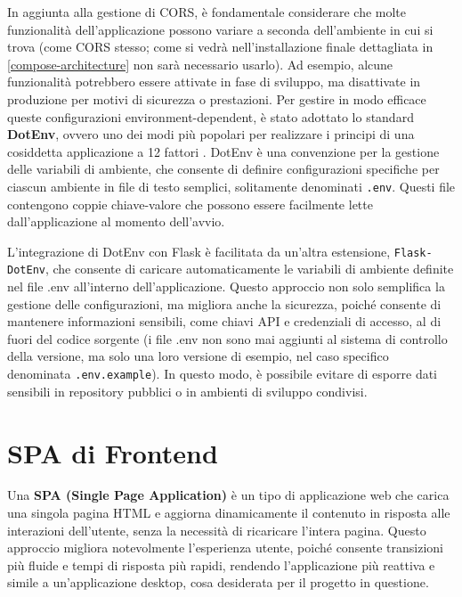 In aggiunta alla gestione di CORS, è fondamentale considerare che molte funzionalità dell'applicazione possono variare a seconda dell'ambiente in cui si trova (come CORS stesso; come si vedrà nell'installazione finale dettagliata in \ref{compose-architecture} non sarà necessario usarlo). Ad esempio, alcune funzionalità potrebbero essere attivate in fase di sviluppo, ma disattivate in produzione per motivi di sicurezza o prestazioni. Per gestire in modo efficace queste configurazioni environment-dependent, è stato adottato lo standard \textbf{DotEnv}, ovvero uno dei modi più popolari per realizzare i principi di una cosiddetta applicazione a 12 fattori \cite{12-factor}. DotEnv è una convenzione per la gestione delle variabili di ambiente, che consente di definire configurazioni specifiche per ciascun ambiente in file di testo semplici, solitamente denominati \texttt{.env}. Questi file contengono coppie chiave-valore che possono essere facilmente lette dall'applicazione al momento dell'avvio.

L'integrazione di DotEnv con Flask è facilitata da un'altra estensione, \texttt{Flask-DotEnv}, che consente di caricare automaticamente le variabili di ambiente definite nel file .env all'interno dell'applicazione. Questo approccio non solo semplifica la gestione delle configurazioni, ma migliora anche la sicurezza, poiché consente di mantenere informazioni sensibili, come chiavi API e credenziali di accesso, al di fuori del codice sorgente (i file .env non sono mai aggiunti al sistema di controllo della versione, ma solo una loro versione di esempio, nel caso specifico denominata \texttt{.env.example}). In questo modo, è possibile evitare di esporre dati sensibili in repository pubblici o in ambienti di sviluppo condivisi.

\section{SPA di Frontend}
Una \textbf{SPA (Single Page Application)} è un tipo di applicazione web che carica una singola pagina HTML e aggiorna dinamicamente il contenuto in risposta alle interazioni dell'utente, senza la necessità di ricaricare l'intera pagina. Questo approccio migliora notevolmente l'esperienza utente, poiché consente transizioni più fluide e tempi di risposta più rapidi, rendendo l'applicazione più reattiva e simile a un'applicazione desktop, cosa desiderata per il progetto in questione.

